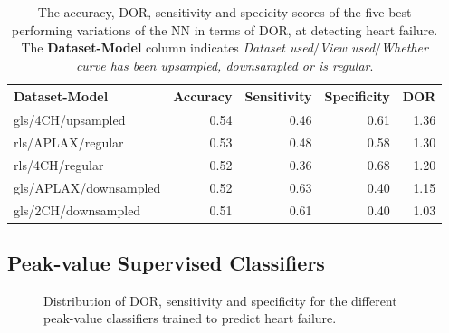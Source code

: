 \begin{table}
    \centering
    \begin{tabular}{lrrrr}
        \toprule
        Dataset-Model         &  Accuracy &  Sensitivity &  Specificity &  DOR \\
        \midrule
        gls/4CH/upsampled     &      0.54 &         0.46 &         0.61 & 1.36 \\
        rls/APLAX/regular     &      0.53 &         0.48 &         0.58 & 1.30 \\
        rls/4CH/regular       &      0.52 &         0.36 &         0.68 & 1.20 \\
        gls/APLAX/downsampled &      0.52 &         0.63 &         0.40 & 1.15 \\
        gls/2CH/downsampled   &      0.51 &         0.61 &         0.40 & 1.03 \\
        \bottomrule
    \end{tabular}
    \caption{The accuracy, DOR, sensitivity and specicity scores of the five best performing variations of the NN in terms of DOR, at detecting heart failure.
             The \textbf{Dataset-Model} column indicates \textit{Dataset used}$/$\textit{View used}$/$\textit{Whether curve has been upsampled, downsampled or is regular}.}
    \label{tab:dl_hf_dor_sens_spec_dist}
\end{table}
\newpage

\subsection{Peak-value Supervised Classifiers}

\begin{figure}[htb]
    \centering
    
    \caption{Distribution of DOR, sensitivity and specificity for the different peak-value classifiers trained to predict heart failure.}
    \label{fig:pvmlc_hf_dor_sens_spec_dis}
\end{figure}

